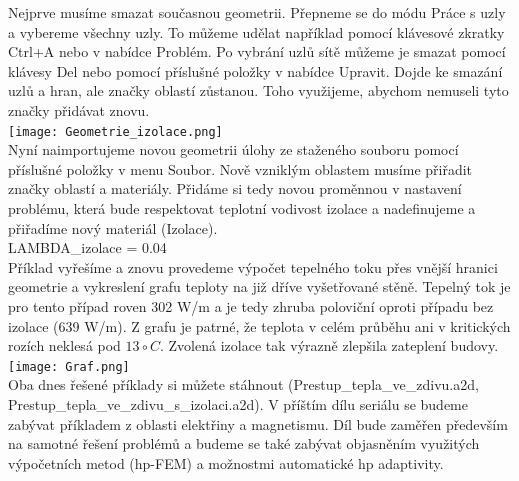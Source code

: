 \documentclass[a4paper, oneside]{article}
\begin{document}
\indent Nejprve musíme smazat současnou geometrii. Přepneme se do módu Práce s uzly a vybereme všechny uzly. To můžeme udělat například pomocí klávesové zkratky Ctrl+A nebo v nabídce Problém. Po vybrání uzlů sítě můžeme je smazat pomocí klávesy Del nebo pomocí příslušné položky v nabídce Upravit. Dojde ke smazání uzlů a hran, ale značky oblastí zůstanou. Toho využijeme, abychom nemuseli tyto značky přidávat znovu.\\
\texttt{[image: Geometrie\_izolace.png]}\\
\indent Nyní naimportujeme novou geometrii úlohy ze staženého souboru pomocí příslušné položky v menu Soubor. Nově vzniklým oblastem musíme přiřadit značky oblastí a materiály. Přidáme si tedy novou proměnnou v nastavení problému, která bude respektovat teplotní vodivost izolace a nadefinujeme a přiřadíme nový materiál (Izolace).\\
LAMBDA\_izolace = 0.04\\
\indent Příklad vyřešíme a znovu provedeme výpočet tepelného toku přes vnější hranici geometrie a vykreslení grafu teploty na již dříve vyšetřované stěně. Tepelný tok je pro tento případ roven 302 W/m a je tedy zhruba poloviční oproti případu bez izolace (639 W/m). Z grafu je patrné, že teplota v celém průběhu ani v kritických rozích neklesá pod $13\circ C$. Zvolená izolace tak výrazně zlepšila zateplení budovy.\\
\texttt{[image: Graf.png]}\\
\indent Oba dnes řešené příklady si můžete stáhnout (Prestup\_tepla\_ve\_zdivu.a2d,\\ Prestup\_tepla\_ve\_zdivu\_s\_izolaci.a2d). V příštím dílu seriálu se budeme zabývat příkladem z oblasti elektřiny a magnetismu. Díl bude zaměřen především na samotné řešení problémů a budeme se také zabývat objasněním využitých výpočetních metod (hp-FEM) a možnostmi automatické hp adaptivity.
\end{document}
